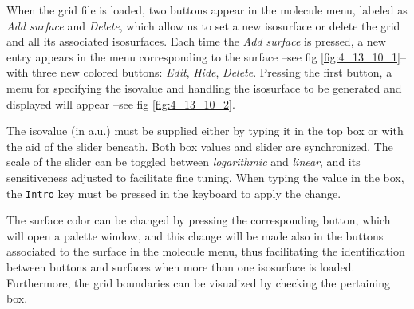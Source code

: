 \documentclass[10pt]{article}
\begin{document}
\vspace*{5mm}

When the grid file is loaded, two buttons appear in the molecule menu, labeled as
{\it Add surface} and {\it Delete}, which allow us to set a new isosurface or delete the grid
and all its associated isosurfaces. Each time the {\it Add surface} is pressed, a new entry appears in the menu corresponding to the surface --see fig \ref{fig:4_13_10_1}-- with three
new colored buttons: {\it Edit}, {\it Hide}, {\it Delete}. Pressing the first button,
a menu for specifying the isovalue and handling the isosurface to be generated and displayed will appear
--see fig \ref{fig:4_13_10_2}.  

The isovalue (in a.u.) must be supplied 
either by typing it in the top box or with the aid of the slider beneath. Both box values
and slider are synchronized. The scale of the slider can be toggled between {\it logarithmic}
and {\it linear}, and its sensitiveness adjusted to facilitate fine tuning.
When typing the value in the box, the \texttt{Intro} key must be 
pressed in the keyboard to apply the change. 

The surface color can be changed by pressing the 
corresponding button, which will open a palette window, and this change will be made also
in the buttons associated to the surface in the molecule menu, thus facilitating
the identification between buttons and surfaces when more than one isosurface is loaded.
Furthermore, the grid boundaries can be visualized by checking the pertaining box.
\end{document}
